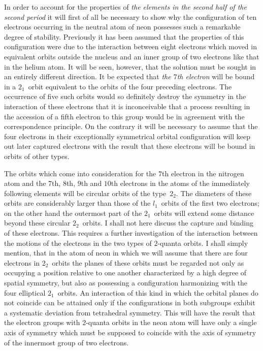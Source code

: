 In order to account for the properties of \emph{the elements in the second
half of the second period} it will first of all be necessary to show
why the configuration of ten electrons occurring in the neutral atom
of neon possesses such a remarkable degree of stability. Previously
it has been assumed that the properties of this configuration were
due to the interaction between eight electrons which moved in
equivalent orbits outside the nucleus and an inner group of two
electrons like that in the helium atom. It will be seen, however,
that the solution must be sought in an entirely different direction.
It  be expected that \emph{the $7$th electron} will be bound in a $2_{1}$~orbit
equivalent to the orbits of the four preceding electrons. The occurrence
of five such orbits would so definitely destroy the symmetry
in the interaction of these electrons that it is inconceivable that a
process resulting in the accession of a fifth electron to this group
would be in agreement with the correspondence principle. On the
contrary it will be necessary to assume that the four electrons in
their exceptionally symmetrical orbital configuration will keep out
later captured electrons with the result that these electrons will be
bound in orbits of other types.

The orbits which come into consideration for the $7$th electron in
the nitrogen atom and the $7$th, $8$th, $9$th and $10$th electrons in the
atoms of the immediately following elements will be circular orbits
of the type~$2_{2}$. The diameters of these orbits are considerably larger
than those of the $l_{1}$~orbits of the first two electrons; on the other
hand the outermost part of the  $2_{1}$~orbits will extend some
distance beyond these circular $2_{2}$~orbits. I shall not here discuss the
capture and binding of these electrons. This requires a further investigation
of the interaction between the motions of the electrons
in the two types of $2$-quanta orbits. I shall simply mention, that
in the atom of neon in which we will assume that there are four
electrons in $2_{2}$~orbits the planes of these orbits must be regarded not
only as occupying a position relative to one another characterized
by a high degree of spatial symmetry, but also as possessing a
configuration harmonizing with the four elliptical $2_{1}$~orbits. An
interaction of this kind in which the orbital planes do not
coincide can be attained only if the configurations in both subgroups
exhibit a systematic deviation from tetrahedral symmetry.
This will have the result that the electron groups with $2$-quanta
orbits in the neon atom will have only a single axis of symmetry
which must be supposed to coincide with the axis of symmetry of
the innermost group of two electrons.

